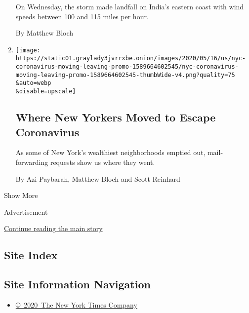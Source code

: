 \begin{enumerate}
  On Wednesday, the storm made landfall on India's eastern coast with
  wind speeds between 100 and 115 miles per hour.

  By Matthew Bloch
\item
  \href{/interactive/2020/05/16/nyregion/nyc-coronavirus-moving-leaving.html}{}

  \texttt{[image: https://static01.graylady3jvrrxbe.onion/images/2020/05/16/us/nyc-coronavirus-moving-leaving-promo-1589664602545/nyc-coronavirus-moving-leaving-promo-1589664602545-thumbWide-v4.png?quality=75\\\&auto=webp\\\&disable=upscale]}

  \hypertarget{where-new-yorkers-moved-to-escape-coronavirus}{%
  \subsection{Where New Yorkers Moved to Escape
  Coronavirus}\label{where-new-yorkers-moved-to-escape-coronavirus}}

  As some of New York's wealthiest neighborhoods emptied out,
  mail-forwarding requests show us where they went.

  By Azi Paybarah, Matthew Bloch and Scott Reinhard
\end{enumerate}

Show More

Advertisement

\protect\hyperlink{after-mid2}{Continue reading the main story}

\hypertarget{site-index}{%
\subsection{Site Index}\label{site-index}}

\hypertarget{site-information-navigation}{%
\subsection{Site Information
Navigation}\label{site-information-navigation}}

\begin{itemize}
\tightlist
\item
  \href{https://help.nytimes3xbfgragh.onion/hc/en-us/articles/115014792127-Copyright-notice}{©~2020~The
  New York Times Company}
\end{itemize}

